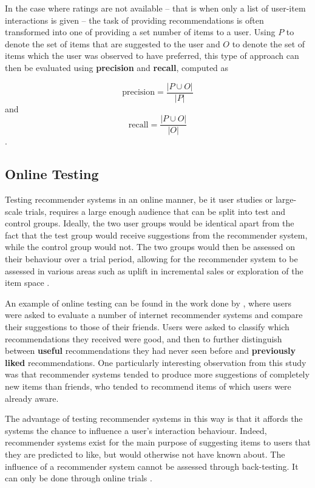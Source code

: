 In the case where ratings are not available -- that is when only a list of user-item interactions is given -- the task of providing recommendations is often transformed into one of providing a set number of items to a user. Using $P$ to denote the set of items that are suggested to the user and $O$ to denote the set of items which the user was observed to have preferred, this type of approach can then be evaluated using \textbf{precision} and \textbf{recall}, computed as

\begin{equation}
    \text{precision} = \dfrac{|P \cup O|}{|P|}
\end{equation}
and
\begin{equation}
    \text{recall} = \dfrac{|P \cup O|}{|O|}
\end{equation}
\parencite{handbook_1.4_neighbourhood}.

\subsection{Online Testing}
Testing recommender systems in an online manner, be it user studies or large-scale trials, requires a large enough audience that can be split into test and control groups. Ideally, the two user groups would be identical apart from the fact that the test group would receive suggestions from the recommender system, while the control group would not. The two groups would then be assessed on their behaviour over a trial period, allowing for the recommender system to be assessed in various areas such as uplift in incremental sales or exploration of the item space \parencite{online_predicting}.

An example of online testing can be found in the work done by \cite{swearingen2001beyondalgorithms}, where users were asked to evaluate a number of internet recommender systems and compare their suggestions to those of their friends. Users were asked to classify which recommendations they received were good, and then to further distinguish between \textbf{useful} recommendations they had never seen before and \textbf{previously liked} recommendations. One particularly interesting observation from this study was that recommender systems tended to produce more suggestions of completely new items than friends, who tended to recommend items of which users were already aware.

The advantage of testing recommender systems in this way is that it affords the systems the chance to influence a user's interaction behaviour. Indeed, recommender systems exist for the main purpose of suggesting items to users that they are predicted to like, but would otherwise not have known about. The influence of a recommender system cannot be assessed through back-testing. It can only be done through online trials \parencite{handbook_1.4_neighbourhood}.

